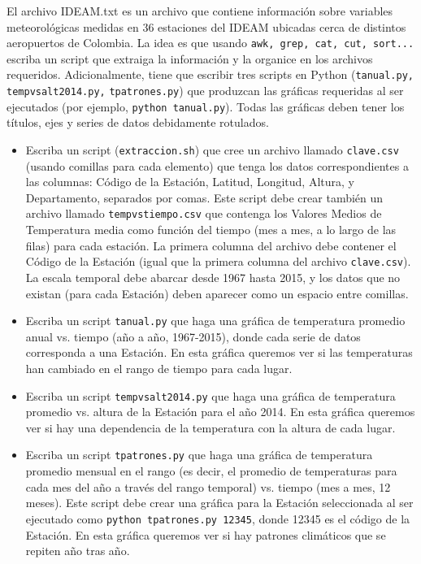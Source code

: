 \documentclass[11pt,letterpaper]{exam}
\begin{document}
\begin{questions}



El archivo IDEAM.txt es un archivo que contiene información sobre variables meteorol\'ogicas medidas en 36 estaciones del IDEAM ubicadas cerca de distintos aeropuertos de Colombia. La idea es que usando \texttt{awk, grep, cat, cut, sort...} escriba un script que extraiga la informaci\'on y la organice en los archivos requeridos. Adicionalmente, tiene que escribir tres scripts en Python (\verb"tanual.py, tempvsalt2014.py,"  \verb"tpatrones.py") que produzcan las gr\'aficas requeridas al ser ejecutados (por ejemplo, \texttt{python tanual.py}). Todas las gr\'aficas deben tener los t\'itulos, ejes y series de datos debidamente rotulados.

\begin{itemize}
	\item Escriba un script (\texttt{extraccion.sh}) que cree un archivo llamado \verb"clave.csv" (usando comillas para cada elemento) que tenga los datos correspondientes a las columnas: C\'odigo de la Estaci\'on, Latitud, Longitud, Altura, y Departamento, separados por comas. Este script debe crear tambi\'en un archivo llamado \verb"tempvstiempo.csv" que contenga los Valores Medios de Temperatura media como función del tiempo (mes a mes, a lo largo de las filas) para cada estaci\'on. La primera columna del archivo debe contener el C\'odigo de la Estaci\'on (igual que la primera columna del archivo \verb"clave.csv"). La escala temporal debe abarcar desde 1967 hasta 2015, y los datos que no existan (para cada Estaci\'on) deben aparecer como un espacio entre comillas.
	\item Escriba un script \texttt{tanual.py} que haga una gr\'afica de temperatura promedio anual vs. tiempo (año a año, 1967-2015), donde cada serie de datos corresponda a una Estaci\'on. En esta gr\'afica queremos ver si las temperaturas han cambiado en el rango de tiempo para cada lugar.
	\item Escriba un script \texttt{tempvsalt2014.py} que haga una gr\'afica de temperatura promedio vs. altura de la Estaci\'on para el año 2014. En esta gr\'afica queremos ver si hay una dependencia de la temperatura con la altura de cada lugar.
	\item Escriba un script \texttt{tpatrones.py} que haga una gráfica de temperatura promedio mensual en el rango (es decir, el promedio de temperaturas para cada mes del año a trav\'es del rango temporal) vs. tiempo (mes a mes, 12 meses). Este script debe crear una gr\'afica para la Estaci\'on seleccionada al ser ejecutado como \texttt{python tpatrones.py 12345}, donde 12345 es el c\'odigo de la Estaci\'on. En esta gr\'afica queremos ver si hay patrones clim\'aticos que se repiten año tras año. 



\end{itemize}
\end{questions}
\end{document}
